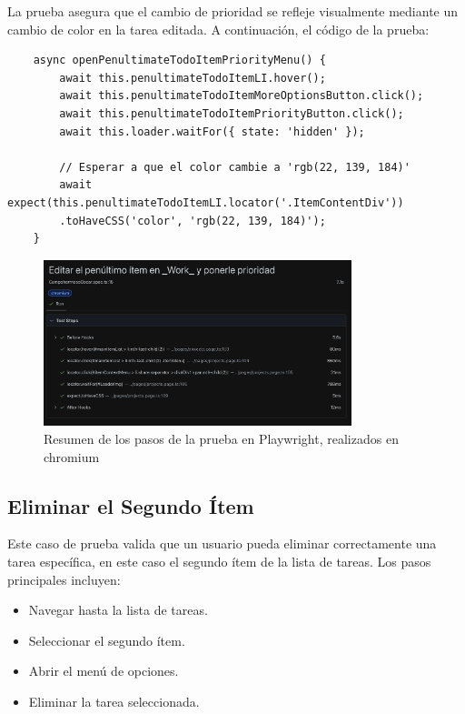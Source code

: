 \documentclass{report}
\begin{document}
La prueba asegura que el cambio de prioridad se refleje visualmente mediante un cambio de color en la tarea editada. A continuación, el código de la prueba:

\begin{lstlisting}
    async openPenultimateTodoItemPriorityMenu() {
        await this.penultimateTodoItemLI.hover();
        await this.penultimateTodoItemMoreOptionsButton.click();
        await this.penultimateTodoItemPriorityButton.click();
        await this.loader.waitFor({ state: 'hidden' });

        // Esperar a que el color cambie a 'rgb(22, 139, 184)'
        await expect(this.penultimateTodoItemLI.locator('.ItemContentDiv'))
        .toHaveCSS('color', 'rgb(22, 139, 184)');
    }
\end{lstlisting}
\begin{figure}[h!]
    \centering
    \includegraphics[width=0.8\textwidth]{./imgs/Captura de pantalla 2024-11-19 a la(s) 12.23.05.png}
    \caption{Resumen de los pasos de la prueba en Playwright, realizados en chromium}
    \label{fig:tc1playwright}
\end{figure}

\subsection{Eliminar el Segundo Ítem}

Este caso de prueba valida que un usuario pueda eliminar correctamente una tarea específica, en este caso el segundo ítem de la lista de tareas. Los pasos principales incluyen:
\begin{itemize}
    \item Navegar hasta la lista de tareas.
    \item Seleccionar el segundo ítem.
    \item Abrir el menú de opciones.
    \item Eliminar la tarea seleccionada.
\end{itemize}
\end{document}
